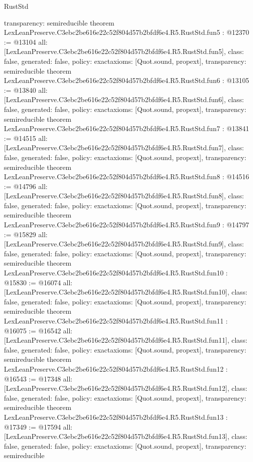\begin{lexlean}{RustStd}
\begin{coremodule}
{  transparency: semireducible
}
theorem LexLeanPreserve.C3ebc2be616e22c52f804d57b2bfdf6e4.R5.RustStd.fun5 : @12370 := @13104 {
  all: [LexLeanPreserve.C3ebc2be616e22c52f804d57b2bfdf6e4.R5.RustStd.fun5],
  class: false,
  generated: false,
  policy: exact{axioms: [Quot.sound, propext]},
  transparency: semireducible
}
theorem LexLeanPreserve.C3ebc2be616e22c52f804d57b2bfdf6e4.R5.RustStd.fun6 : @13105 := @13840 {
  all: [LexLeanPreserve.C3ebc2be616e22c52f804d57b2bfdf6e4.R5.RustStd.fun6],
  class: false,
  generated: false,
  policy: exact{axioms: [Quot.sound, propext]},
  transparency: semireducible
}
theorem LexLeanPreserve.C3ebc2be616e22c52f804d57b2bfdf6e4.R5.RustStd.fun7 : @13841 := @14515 {
  all: [LexLeanPreserve.C3ebc2be616e22c52f804d57b2bfdf6e4.R5.RustStd.fun7],
  class: false,
  generated: false,
  policy: exact{axioms: [Quot.sound, propext]},
  transparency: semireducible
}
theorem LexLeanPreserve.C3ebc2be616e22c52f804d57b2bfdf6e4.R5.RustStd.fun8 : @14516 := @14796 {
  all: [LexLeanPreserve.C3ebc2be616e22c52f804d57b2bfdf6e4.R5.RustStd.fun8],
  class: false,
  generated: false,
  policy: exact{axioms: [Quot.sound, propext]},
  transparency: semireducible
}
theorem LexLeanPreserve.C3ebc2be616e22c52f804d57b2bfdf6e4.R5.RustStd.fun9 : @14797 := @15829 {
  all: [LexLeanPreserve.C3ebc2be616e22c52f804d57b2bfdf6e4.R5.RustStd.fun9],
  class: false,
  generated: false,
  policy: exact{axioms: [Quot.sound, propext]},
  transparency: semireducible
}
theorem LexLeanPreserve.C3ebc2be616e22c52f804d57b2bfdf6e4.R5.RustStd.fun10 : @15830 := @16074 {
  all: [LexLeanPreserve.C3ebc2be616e22c52f804d57b2bfdf6e4.R5.RustStd.fun10],
  class: false,
  generated: false,
  policy: exact{axioms: [Quot.sound, propext]},
  transparency: semireducible
}
theorem LexLeanPreserve.C3ebc2be616e22c52f804d57b2bfdf6e4.R5.RustStd.fun11 : @16075 := @16542 {
  all: [LexLeanPreserve.C3ebc2be616e22c52f804d57b2bfdf6e4.R5.RustStd.fun11],
  class: false,
  generated: false,
  policy: exact{axioms: [Quot.sound, propext]},
  transparency: semireducible
}
theorem LexLeanPreserve.C3ebc2be616e22c52f804d57b2bfdf6e4.R5.RustStd.fun12 : @16543 := @17348 {
  all: [LexLeanPreserve.C3ebc2be616e22c52f804d57b2bfdf6e4.R5.RustStd.fun12],
  class: false,
  generated: false,
  policy: exact{axioms: [Quot.sound, propext]},
  transparency: semireducible
}
theorem LexLeanPreserve.C3ebc2be616e22c52f804d57b2bfdf6e4.R5.RustStd.fun13 : @17349 := @17594 {
  all: [LexLeanPreserve.C3ebc2be616e22c52f804d57b2bfdf6e4.R5.RustStd.fun13],
  class: false,
  generated: false,
  policy: exact{axioms: [Quot.sound, propext]},
  transparency: semireducible
}
\end{coremodule}
\end{lexlean}
